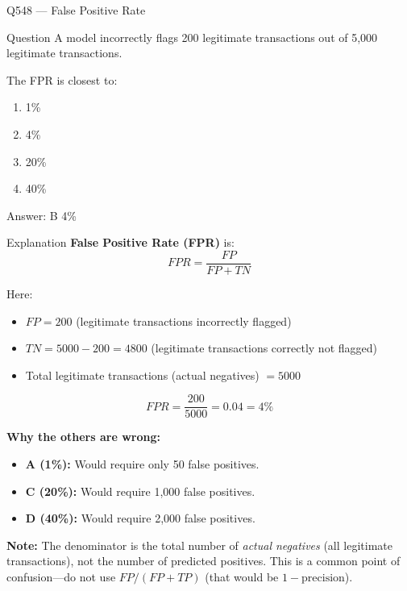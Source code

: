 \documentclass[aspectratio=169,8pt]{beamer}
\begin{document}
	\begin{frame}{Q548 --- False Positive Rate}
		\begin{block}{Question}
			A model incorrectly flags 200 legitimate transactions out of 5,000 legitimate transactions.
			
			The FPR is closest to:
			
			\begin{enumerate}
				\item 1\%
				\item 4\%
				\item 20\%
				\item 40\%
			\end{enumerate}
		\end{block}
		
		\begin{exampleblock}{Answer: B}
			4\%
		\end{exampleblock}
		
		\begin{block}{Explanation}
			\textbf{False Positive Rate (FPR)} is:
			\[
			FPR = \frac{FP}{FP + TN}
			\]
			
			Here:
			\begin{itemize}
				\item \(FP = 200\) (legitimate transactions incorrectly flagged)
				\item \(TN = 5000 - 200 = 4800\) (legitimate transactions correctly not flagged)
				\item Total legitimate transactions (actual negatives) \(= 5000\)
			\end{itemize}
			
			\[
			FPR = \frac{200}{5000} = 0.04 = 4\%
			\]
			
			\textbf{Why the others are wrong:}
			\begin{itemize}
				\item \textbf{A (1\%):} Would require only 50 false positives.
				\item \textbf{C (20\%):} Would require 1,000 false positives.
				\item \textbf{D (40\%):} Would require 2,000 false positives.
			\end{itemize}
			
			\textbf{Note:} The denominator is the total number of \emph{actual negatives}
			(all legitimate transactions), not the number of predicted positives. This is
			a common point of confusion---do not use \(FP/(FP+TP)\) (that would be
			\(1 - \text{precision}\)).
		\end{block}
	\end{frame}
	
\end{document}
